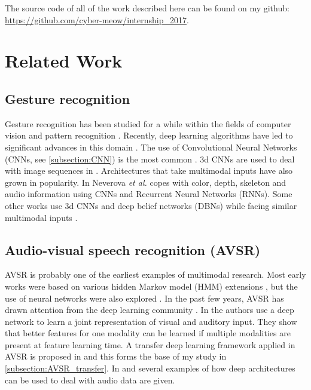 The source code of all of the work described here can be found on my
github: \href{https://github.com/cyber-meow/internship_2017}
{https://github.com/cyber-meow/internship\_2017}.

\section{Related Work} \label{section:related}

\subsection{Gesture recognition}

Gesture recognition has been studied for a while within the fields of
computer vision and pattern recognition
\cite{T. Starner 1998, S. Mitra 2007}.
Recently, deep learning algorithms have led to
significant advances in this domain \cite{M. Asadi-Aghbolaghi 2017}.
The use of Convolutional Neural Networks (CNNs, see \ref{subsection:CNN})
is the most common
\cite{J. Nagi 2011}. 3d CNNs are used to deal with image sequences in
\cite{P. Molchanov 2015}. Architectures that take multimodal inputs
have also grown in popularity. In \cite{N. Neverova 2013}
Neverova \textit{et al.} copes with color,
depth, skeleton and audio information using CNNs and Recurrent
Neural Networks (RNNs). Some other works use 3d CNNs and deep belief
networks (DBNs) while facing similar multimodal inputs
\cite{N. Neverova 2014, L. Pigou 2014, D. Wu 2016}.

\subsection{Audio-visual speech recognition (AVSR)}

AVSR is probably one of the earliest examples of multimodal research.
Most early works were based on various hidden Markov model (HMM) extensions
\cite{G. Potamianos 2004}, but the use of neural networks were also
explored \cite{C. Bregler 1994, B. P. Yuhas 1989}. 
In the past few years, AVSR has drawn attention from the
deep learning community
\cite{J. Ngiam 2011, K. Noda 2014, A. K. Katsaggelos 2015}.
In \cite{J. Ngiam 2011} the authors use a deep network to learn a
joint representation of visual and auditory input.
They show that better features for one modality can be learned if
multiple modalities are present at feature learning time.
A transfer deep learning framework applied in AVSR is proposed in
\cite{S. Moon 2015} and this forms the base of my study in
\ref{subsection:AVSR_transfer}. In \cite{L. Deng 2013} and
\cite{G. Hinton 2012} several examples of how deep architectures can
be used to deal with audio data are given.

